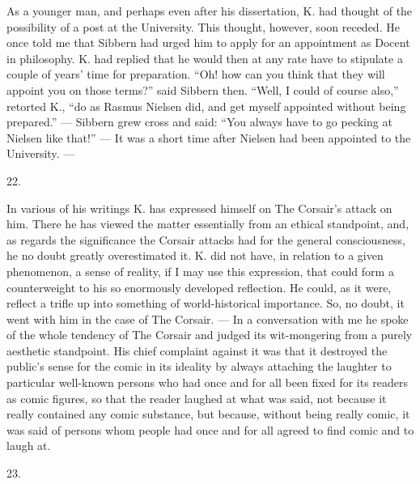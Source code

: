 \documentclass[12pt,a4paper,openany]{book}
\newcommand{\secnum}[1]{\par\begin{center}#1\end{center}\par\nobreak}
\newcommand{\opage}[1]{\marginnote{\footnotesize\textit{[#1]}}}
\begin{document}
As a younger man, and perhaps even after his dissertation, K. had thought
of the possibility of a post at the University. This thought, however,
soon receded. He once told me that Sibbern had urged him to apply for an
appointment as Docent in philosophy.
K. had replied that he would then at any rate have to stipulate a couple of
years' time for preparation. ``Oh! how can you think that they will
appoint you on those terms?'' said Sibbern then. ``Well, I could of
course also,'' retorted K., ``do as Rasmus Nielsen did, and get myself
appointed without being prepared.'' --- Sibbern grew cross and said:
``You always have to go pecking at Nielsen like that!'' --- It was a short
time after Nielsen had been appointed to the University.
---\,\dotfill\par
\noindent\dotfill\par
\noindent\dotfill

\secnum{22.}

In various of his writings K. has expressed himself on The Corsair's
attack on him. There he has viewed the matter essentially from an ethical
standpoint, and, as regards the significance the Corsair attacks had for
the general consciousness, he no doubt greatly overestimated
\opage{353}it. K. did not have, in relation to a given phenomenon, a
sense of reality, if I may use this expression, that could form a
counterweight to his so enormously developed reflection. He could, as it
were, reflect a trifle up into something of world-historical importance.
So, no doubt, it went with him in the case of The Corsair. --- In a
conversation with me he spoke of the whole tendency of The Corsair and
judged its wit-mongering from a purely aesthetic standpoint. His chief
complaint against it was that it destroyed the public's sense for the
comic in its ideality by always attaching the laughter to particular
well-known persons who had once and for all been fixed for its readers as
comic figures, so that the reader laughed at what was said, not because
it really contained any comic substance, but because, without being really
comic, it was said of persons whom people had once and for all agreed to
find comic and to laugh at.

\secnum{23.}
\end{document}
